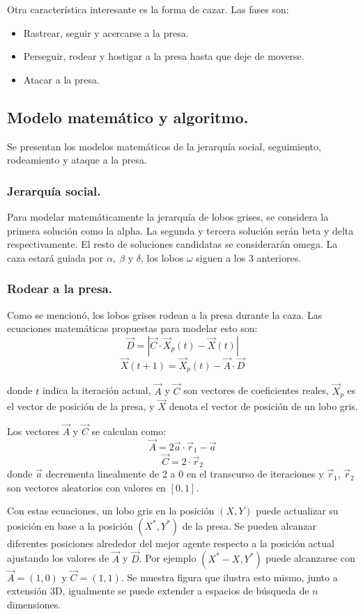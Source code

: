 \documentclass[11pt,a4paper]{article}
\theoremstyle{definition}
\begin{document}
	Otra característica interesante es la forma de cazar. Las fases son:
	\begin{itemize}
		\item Rastrear, seguir y acercarse a la presa.
		\item Perseguir, rodear y hostigar a la presa hasta que deje de moverse.
		\item Atacar a la presa.
	\end{itemize}
	
	\subsection{Modelo matemático y algoritmo.}
	Se presentan los modelos matemáticos de la jerarquía social, seguimiento, rodeamiento y ataque a la presa.
	\subsubsection{Jerarquía social.}
	Para modelar matemáticamente la jerarquía de lobos grises, se considera la primera solución como la alpha. La segunda y tercera solución serán beta y delta respectivamente. El resto de soluciones candidatas se considerarán omega. La caza estará guiada por $\alpha, \ \beta \text{ y } \delta$, los lobos $\omega$ siguen a los 3 anteriores.
	\subsubsection{Rodear a la presa.}
	Como se mencionó, los lobos grises rodean a la presa durante la caza. Las ecuaciones matemáticas propuestas para modelar esto son:
	$$\vec{D} = |\vec{C} \cdot \vec{X}_p(t)-\vec{X}(t)|$$
	$$\vec{X}(t+1)=\vec{X}_p(t)-\vec{A}\cdot \vec{D}$$
	
	donde $t$ indica la iteración actual, $\vec{A}$ y $\vec{C}$ son vectores de coeficientes reales, $\vec{X}_p$  es el vector de posición de la presa, y $\vec{X}$ denota el vector de posición de un lobo gris.
	
	Los vectores $\vec{A}$ y $\vec{C}$ se calculan como:
	$$\vec{A}=2\vec{a}\cdot \vec{r}_1 -\vec{a}$$
	$$\vec{C}=2\cdot \vec{r}_2$$
	donde $\vec{a}$ decrementa linealmente de 2 a 0 en el transcurso de iteraciones y $\vec{r}_1$, $\vec{r}_2$ son vectores aleatorios con valores en $[0,1]$. 
	
	Con estas ecuaciones, un lobo gris en la posición $(X,Y)$ puede actualizar su posición en base a la posición $(X^*,Y^*)$ de la presa. Se pueden alcanzar diferentes posiciones alrededor del mejor agente respecto a la posición actual ajustando los valores de $\vec{A}$ y $\vec{D}$. Por ejemplo $(X^* - X, Y^*)$ puede alcanzarse con $\vec{A}=(1,0)$ y $\vec{C}=(1,1)$. Se muestra figura que ilustra esto mismo, junto a extensión 3D, igualmente se puede extender a espacios de búsqueda de $n$ dimensiones.
	
\end{document}
